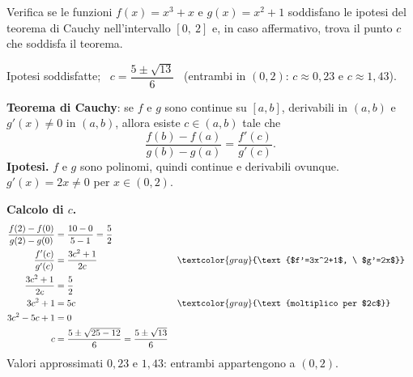 \begin{question}[ID=1.1, subtitle={Teorema di Cauchy per $x^3+x$ e $x^2+1$ su $[0,2]$}, tags={cauchy, teoremi}, difficulty=media]
Verifica se le funzioni \(f(x) = x^3 + x\) e \(g(x) = x^2 + 1\) soddisfano le ipotesi del teorema di Cauchy nell'intervallo \([0,\ 2]\) e, in caso affermativo, trova il punto \(c\) che soddisfa il teorema.
\begin{solution}
Ipotesi soddisfatte; \ $c=\dfrac{5\pm\sqrt{13}}{6}$ \ (entrambi in $(0,2)$: $c\approx0{,}23$ e $c\approx1{,}43$).
\end{solution}
\begin{explanation}
\textbf{Teorema di Cauchy}: se $f$ e $g$ sono continue su $[a,b]$, derivabili in $(a,b)$ e $g'(x)\neq0$ in $(a,b)$, allora esiste $c\in(a,b)$ tale che
\[ \dfrac{f(b)-f(a)}{g(b)-g(a)}=\dfrac{f'(c)}{g'(c)}. \]
\textbf{Ipotesi.} $f$ e $g$ sono polinomi, quindi continue e derivabili ovunque. $g'(x)=2x\neq0$ per $x\in(0,2)$.

\textbf{Calcolo di $c$.}
\[\begin{aligned}
\dfrac{f(2)-f(0)}{g(2)-g(0)} &= \dfrac{10-0}{5-1}=\dfrac52\\
\dfrac{f'(c)}{g'(c)} &= \dfrac{3c^2+1}{2c} && \textcolor{gray}{\text{$f'=3x^2+1$, \ $g'=2x$}}\\
\dfrac{3c^2+1}{2c} &= \dfrac52\\
3c^2+1 &= 5c && \textcolor{gray}{\text{moltiplico per $2c$}}\\
3c^2-5c+1 &= 0\\
c &= \dfrac{5\pm\sqrt{25-12}}{6}=\dfrac{5\pm\sqrt{13}}{6}
\end{aligned}\]
Valori approssimati $0{,}23$ e $1{,}43$: entrambi appartengono a $(0,2)$.
\end{explanation}
\end{question}


